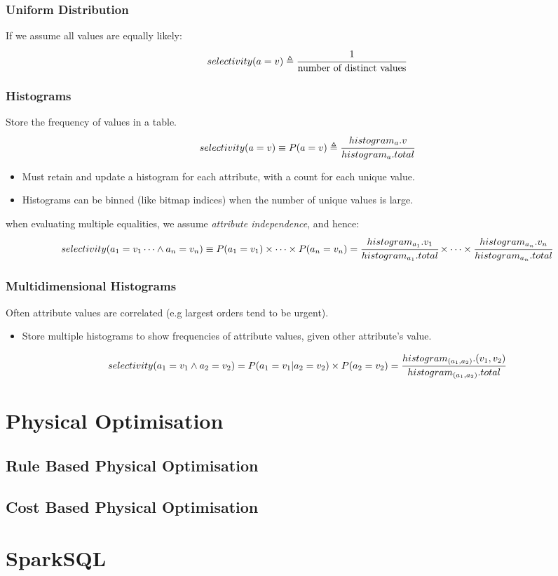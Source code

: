 \subsubsection{Uniform Distribution}
If we assume all values are equally likely:
\[selectivity(a = v) \triangleq \cfrac{1}{\text{number of distinct values}}\]


\subsubsection{Histograms}
Store the frequency of values in a table.
\[selectivity(a = v) \equiv P(a = v) \triangleq \cfrac{histogram_a.v}{histogram_a.total} \]
\begin{itemize}
    \item Must retain and update a histogram for each attribute, with a count for each unique value.
    \item Histograms can be binned (like bitmap indices) when the number of unique values is large.
\end{itemize}
when evaluating multiple equalities, we assume \textit{attribute independence}, and hence:
\[selectivity(a_1 = v_1  \dots \land a_n = v_n) \equiv P(a_1 = v_1) \times \dots \times P(a_n = v_n) = \cfrac{histogram_{a_1}.v_1}{histogram_{a_1}.total} \times \dots \times \cfrac{histogram_{a_n}.v_n}{histogram_{a_n}.total}\]

\subsubsection{Multidimensional Histograms}
Often attribute values are correlated (e.g largest orders tend to be urgent).
\begin{itemize}
    \item Store multiple histograms to show frequencies of attribute values, given other attribute's value.
\end{itemize}

\[selectivity(a_1 = v_1 \land a_2 = v_2) = P(a_1 = v_1 | a_2 = v_2) \times P(a_2 = v_2) = \cfrac{histogram_{(a_1, a_2)}.(v_1, v_2)}{histogram_{(a_1, a_2)}.total} \]

\section{Physical Optimisation}

\subsection{Rule Based Physical Optimisation}


\subsection{Cost Based Physical Optimisation}


\section{SparkSQL}
\unfinished
